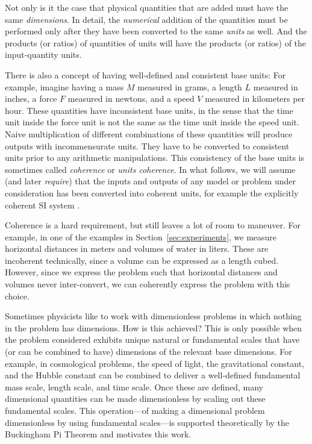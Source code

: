 \documentclass[twoside,11pt]{article}
\newcommand{\sectionname}{Section}
\newcommand{\secref}[1]{\sectionname~\ref{#1}}
\begin{document}
Not only is it the case that physical quantities that are added must have the same \emph{dimensions}.
In detail, the \emph{numerical} addition of the quantities must be performed only after they have been converted to the same \emph{units} as well.
And the products (or ratios) of quantities of units will have the products (or ratios) of the input-quantity units.

There is also a concept of having well-defined and consistent base units:
For example, imagine having a mass $M$ measured in grams, a length $L$ measured in inches, a force $F$ measured in newtons, and a speed $V$ measured in kilometers per hour. These quantities have inconsistent base units, in the sense that the time unit inside the force unit is not the same as the time unit inside the speed unit.
Naive multiplication of different combinations of these quantities will produce outputs with incommensurate units.
They have to be converted to consistent units prior to any arithmetic manipulations.
This consistency of the base units is sometimes called \emph{coherence} or \emph{units coherence}.
In what follows, we will assume (and later \emph{require}) that the inputs and outputs of any model or problem under consideration has been converted into coherent units, for example the explicitly coherent SI system \citep{si}.

Coherence is a hard requirement, but still leaves a lot of room to maneuver.
For example, in one of the examples in \secref{sec:experiments}, we measure horizontal distances in meters and volumes of water in liters.
These are incoherent technically, since a volume can be expressed as a length cubed.
However, since we express the problem such that horizontal distances and volumes never inter-convert, we can coherently express the problem with this choice.

Sometimes physicists like to work with dimensionless problems in which nothing in the problem has dimensions.
How is this achieved?
This is only possible when the problem considered exhibits unique natural or fundamental scales that have (or can be combined to have) dimensions of the relevant base dimensions.
For example, in cosmological problems, the speed of light, the gravitational constant, and the Hubble constant can be combined to deliver a well-defined fundamental mass scale, length scale, and time scale.
Once these are defined, many dimensional quantities can be made dimensionless by scaling out these fundamental scales.
This operation---of making a dimensional problem dimensionless by using fundamental scales---is supported theoretically by the Buckingham Pi Theorem \citep{buckingham1914pi} and motivates this work. 
\end{document}
